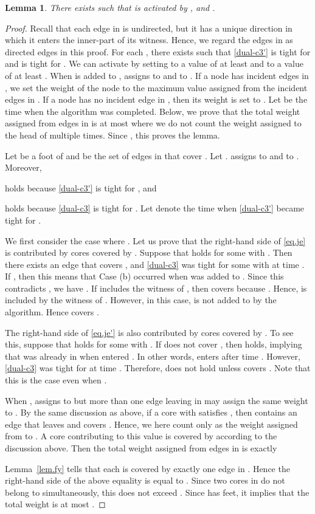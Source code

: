 \documentclass[11pt]{article}
\newtheorem{lemma}{Lemma}
\begin{document}
\begin{lemma}\label{lem.spider-lp}
 There exists  such that  is
 activated by , and .
\end{lemma}
\begin{proof}
 Recall that each edge in  is undirected, but it has a unique
 direction in which it enters the inner-part of its witness.
 Hence, we regard the edges in  as directed edges in this proof.
 For each ,
 there exists 
 such that 
 \eqref{dual-c3'} is tight for 
  and  is tight for .
 We can activate  by setting  to a value of at least  and
  to a value of at least .
 When  is added to ,  assigns  to  and  to .
 If a node has incident edges in ,
 we set the weight of the node to the maximum value assigned from the
 incident edges in .
 If a node has no incident edge in , then its weight is set to .
 Let  be the time when the algorithm was completed.
 Below, we prove that the total weight assigned from edges in 
 is at most  where we do not count
 the weight assigned to the head  of  multiple times.
  Since , this proves
 the lemma.

 Let  be a foot of  and
  be the set of edges in  that cover .
 Let .   assigns 
 to   and  to .
 Moreover,

 holds because \eqref{dual-c3'} is tight for ,
 and 

 holds because \eqref{dual-c3} is tight for . 
 Let  denote the time when  \eqref{dual-c3'} became tight for .

 We first consider the case where .
 Let us prove that the right-hand side of \eqref{eq.je} is contributed
 by cores covered by . 
 Suppose that  holds for some  with
 . 
 Then there exists an edge
  that covers , and
 \eqref{dual-c3} was tight for some 
 with 
 at time .
  If ,
 then
 this means that Case (b) occurred when  was added to .
 Since this contradicts ,
 we have .
 If  includes the witness of ,
 then  covers  because .
 Hence,
  is included by the
 witness of . However, in this case, 
  is not added to  by the algorithm.
 Hence  covers .

 The right-hand side of \eqref{eq.je'} is also contributed by
 cores covered by .
 To see this, suppose that 
 holds for some  with .
 If  does not cover ,
 then  holds, implying that  was already in  when  entered
 .
 In other words,  enters  after time .
 However, \eqref{dual-c3} was tight for  at time .
 Therefore,  does not hold unless  covers
 . Note that this is the case even when .

 When ,  assigns  to  but 
 more than one edge leaving  in  may assign the same weight to .
 By the same discussion as above, 
 if a core  with  satisfies
 ,
 then  contains an edge that leaves  and covers .
 Hence, we here count only  as the weight assigned from  to .
 A core  contributing to this value is covered by
  according to the discussion above.
 Then the total weight assigned from edges in  is exactly
 
 Lemma~\ref{lem.fy} tells that each  is covered by exactly one edge in .
 Hence the right-hand side of the above equality is equal to .
 Since two cores in  do not belong to  simultaneously, 
 this does not exceed .
 Since  has  feet, it implies that 
 the total weight is at most .
 \end{proof}
\end{document}
